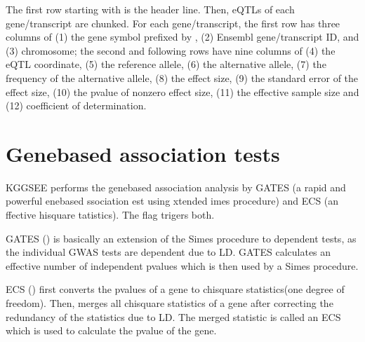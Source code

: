 \documentclass[letterpaper,10pt,english,openany,oneside]{sphinxmanual}
\begin{document}
\sphinxAtStartPar
The first row starting with \sphinxcode{\sphinxupquote{\#}} is the header line. Then, eQTLs of each gene/transcript are chunked. For each gene/transcript, the first row has three columns of (1) the gene symbol prefixed by \sphinxcode{\sphinxupquote{\textgreater{}}}, (2) Ensembl gene/transcript ID, and (3) chromosome; the second and following rows have nine columns of (4) the eQTL coordinate, (5) the reference allele, (6) the alternative allele, (7) the frequency of the alternative allele, (8) the effect size, (9) the standard error of the effect size, (10) the p\sphinxhyphen{}value of nonzero effect size, (11) the effective sample size and (12) coefficient of determination.


\section{Gene\sphinxhyphen{}based association tests}
\label{\detokenize{detailed_document:gene-based-association-tests}}\label{\detokenize{detailed_document:detail-ecs}}
\sphinxAtStartPar
KGGSEE performs the gene\sphinxhyphen{}based association analysis by GATES (a rapid and powerful ene\sphinxhyphen{}based ssociation est using xtended imes procedure) and ECS (an ffective hi\sphinxhyphen{}square  tatistics). The  flag trigers both.

\sphinxAtStartPar
GATES () is basically an extension of the Simes procedure to dependent tests, as the individual GWAS tests are dependent due to LD. GATES calculates an effective number of independent p\sphinxhyphen{}values which is then used by a Simes procedure.

\sphinxAtStartPar
ECS () first converts the p\sphinxhyphen{}values of a gene to chi\sphinxhyphen{}square statistics(one degree of freedom). Then, merges all chi\sphinxhyphen{}square statistics of a gene after correcting the redundancy of the statistics due to LD. The merged statistic is called an ECS which is used to calculate the p\sphinxhyphen{}value of the gene.
\end{document}
